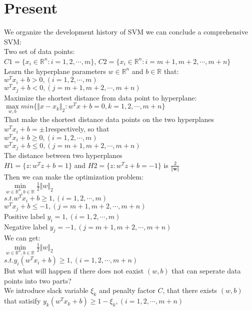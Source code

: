 \documentclass{article}
\begin{document}
\section{Present}
We organize the development history of SVM we can conclude a comprehensive SVM:\\
Two set of data points:\\
$C1 = \{x_i \in \mathbb{R}^n:i = 1,2,\cdots ,m\}$, $C2 = \{x_i \in \mathbb{R}^n:i = m+1,m+2,\cdots ,m+n\}$\\
Learn the hyperplane parameters $w \in \mathbb{R}^n $ and $b \in \mathbb{R}$ that:\\
$w^Tx_i + b > 0, (i = 1,2,\cdots,m)$ \\
$w^Tx_j + b < 0, (j = m+1,m+2,\cdots,m+n)$ \\
Maximize the shortest distance from data point to hyperplane:\\
$\max\limits_{w,b} min \{\Vert x - x_k \Vert_2: w^Tx + b=0, k = 1,2,\cdots,m+n\}$\\
That make the shortest distance data points on the two hyperplanes $w^Tx_i + b =\pm 1 $respectively, so that\\
$w^Tx_i + b \geq 0, (i = 1,2,\cdots,m)$ \\
$w^Tx_j + b \leq 0, (j = m+1,m+2,\cdots,m+n)$ \\
The distance between two hyperplanes \\
$H1 = \{z: w^Tz + b =1\}$ and $H2 = \{z: w^Tz + b = -1\}$ is $\frac{2}{\Vert \bm{w} \Vert}$\\
Then we can make the optimization problem:\\
$\min\limits_{w \in \mathbb{R}^n,b \in \mathbb{R}} \frac{1}{2} \Vert w \Vert_2$\\
$s.t. w^Tx_i + b \geq 1, (i = 1,2,\cdots,m)$ \\
$w^Tx_j + b \leq -1, (j = m+1,m+2,\cdots,m+n)$\\
Positive label $y_i = 1,(i = 1,2,\cdots,m)$\\
Negative label $y_j = -1,(j = m+1,m+2,\cdots,m+n)$\\
We can get:\\
$\min\limits_{w \in \mathbb{R}^n,b \in \mathbb{R}} \frac{1}{2} \Vert w \Vert_2$\\
$s.t. y_i(w^Tx_i + b) \geq 1, (i = 1,2,\cdots,m+n)$ \\
But what will happen if there does not eaxist $(w,b)$ that can seperate data points into two parts?\\
We introduce slack variable $\xi_k$ and penalty factor $C$, that there exists $(w,b)$ that satisify $y_k(w^Tx_k + b) \geq 1 - \xi_k, (i = 1,2,\cdots,m+n)$\\
\end{document}
